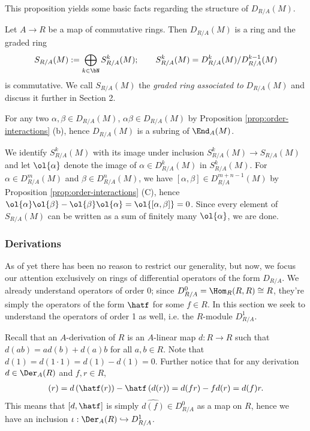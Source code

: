This proposition yields some basic facts regarding the structure of $D_{R/A}(M)$.
\begin{cor}\label{cor:ring-of-diff-ops}
	Let $A \to R$ be a map of commutative rings. Then $D_{R/A}(M)$ is a ring and the graded ring 
	\begin{align*}
		S_{R/A}(M) := \bigoplus_{k \in \bN}S^k_{R/A}(M); \hspace{2em} S^k_{R/A}(M) = D^k_{R/A}(M)/D^{k-1}_{R/A}(M)
	\end{align*}
	is commutative. We call $S_{R/A}(M)$ the \emph{graded ring associated to} $D_{R/A}(M)$ and discuss it further in Section 2. 
\end{cor}
\begin{prf}
	For any two $\alpha,\beta \in D_{R/A}(M)$, $\alpha \beta \in D_{R/A}(M)$ by Proposition \ref{prop:order-interactions} (b), hence $D_{R/A}(M)$ is a subring of $\End_A(M)$.

	We identify $S^k_{R/A}(M)$ with its image under inclusion $S^k_{R/A}(M) \to S_{R/A}(M)$ and let $\ol{\alpha}$ denote the image of $\alpha \in D^k_{R/A}(M)$ in $S^k_{R/A}(M)$. For $\alpha \in D^m_{R/A}(M)$ and $\beta \in D^n_{R/A}(M)$, we have $[\alpha,\beta] \in D^{m+n-1}_{R/A}(M)$ by Proposition \ref{prop:order-interactions} (C), hence $\ol{\alpha}\ol{\beta} - \ol{\beta}\ol{\alpha} = \ol{[\alpha,\beta]} = 0$. Since every element of $S_{R/A}(M)$ can be written as a sum of finitely many $\ol{\alpha}$, we are done.
\end{prf}

\subsubsection{Derivations}
As of yet there has been no reason to restrict our generality, but now, we focus our attention exclusively on rings of differential operators of the form $D_{R/A}$. We already understand operators of order 0; since $D^0_{R/A} = \Hom_R(R,R) \cong R$, they're simply the operators of the form $\hatf$ for some $f\in R$. In this section we seek to understand the operators of order 1 as well, i.e. the $R$-module $D^1_{R/A}$.

Recall that an $A$-derivation of $R$ is an $A$-linear map $d:R\to R$ such that $d(ab) = ad(b) + d(a)b$ for all $a,b\in R$. Note that $d(1) = d(1\cdot 1) = d(1) - d(1) = 0$. Further notice that for any derivation $d \in \Der_A(R)$ and $f,r \in R$,
\begin{align*}
	[d,\hatf](r) = d\left(\hatf(r)\right) - \hatf\left(d(r)\right) = d(fr) - fd(r) = d(f)r.
\end{align*}
This means that $[d,\hatf]$ is simply $\widehat{d(f)} \in D^0_{R/A}$ as a map on $R$, hence we have an inclusion $\iota: \Der_A(R) \hookrightarrow D^1_{R/A}$.

